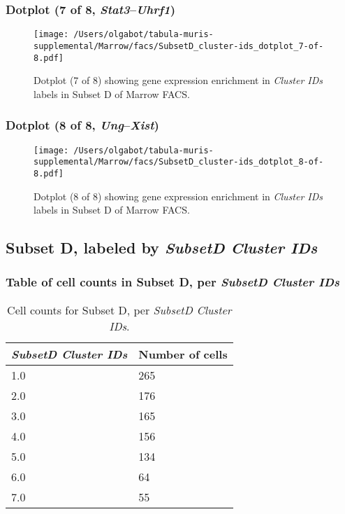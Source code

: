 \clearpage

\subsubsection{Dotplot (7 of 8, \emph{Stat3}--\emph{Uhrf1})}
\begin{figure}[h]
\centering
\texttt{[image: /Users/olgabot/tabula-muris-supplemental/Marrow/facs/SubsetD\_cluster-ids\_dotplot\_7-of-8.pdf]}

\caption{ Dotplot (7 of 8)  showing gene expression enrichment in \emph{Cluster IDs} labels in Subset D of Marrow FACS. }
\end{figure}


\clearpage

\subsubsection{Dotplot (8 of 8, \emph{Ung}--\emph{Xist})}
\begin{figure}[h]
\centering
\texttt{[image: /Users/olgabot/tabula-muris-supplemental/Marrow/facs/SubsetD\_cluster-ids\_dotplot\_8-of-8.pdf]}

\caption{ Dotplot (8 of 8)  showing gene expression enrichment in \emph{Cluster IDs} labels in Subset D of Marrow FACS. }
\end{figure}


\clearpage

\subsection{Subset D, labeled by \emph{SubsetD Cluster IDs}}
\subsubsection{Table of cell counts in Subset D, per \emph{SubsetD Cluster IDs}}\begin{table}[h]
\centering
\label{my-label}
\begin{tabular}{@{}ll@{}}
\toprule

\emph{SubsetD Cluster IDs}& Number of cells \\ \midrule
1.0 & 265 \\

2.0 & 176 \\

3.0 & 165 \\

4.0 & 156 \\

5.0 & 134 \\

6.0 & 64 \\

7.0 & 55 \\
\bottomrule
\end{tabular}
\caption{Cell counts for Subset D, per \emph{SubsetD Cluster IDs}.}
\end{table}

